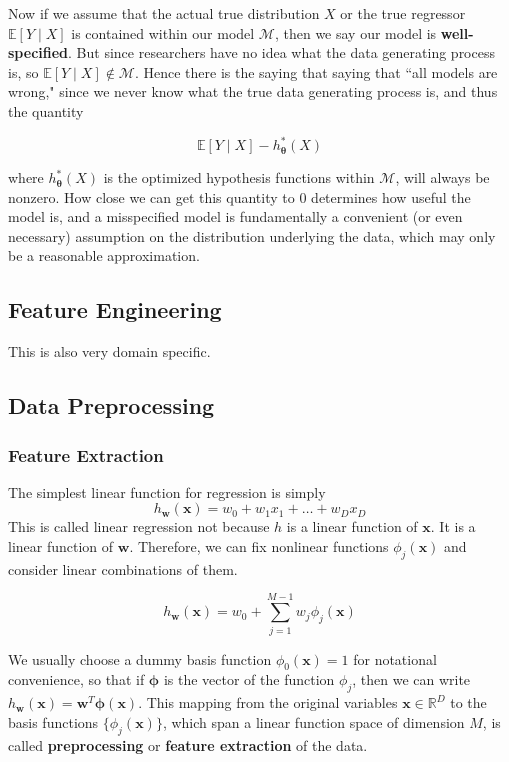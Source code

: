 \documentclass{article}
\begin{document}
    Now if we assume that the actual true distribution $X$ or the true regressor $\mathbb{E}[Y\mid X]$ is contained within our model $\mathcal{M}$, then we say our model is \textbf{well-specified}. But since researchers have no idea what the data generating process is, so $\mathbb{E}[Y\mid X] \not\in \mathcal{M}$. Hence there is the saying that saying that ``all models are wrong," since we never know what the true data generating process is, and thus the quantity 

      \[\mathbb{E}[Y \mid X] - h_{\boldsymbol{\theta}}^\ast (X)\]

    where $h_{\boldsymbol{\theta}}^\ast (X)$ is the optimized hypothesis functions within $\mathcal{M}$, will always be nonzero. How close we can get this quantity to $0$ determines how useful the model is, and a misspecified model is fundamentally a convenient (or even necessary) assumption on the distribution underlying the data, which may only be a reasonable approximation. 

  \subsection{Feature Engineering} 

    This is also very domain specific. 

  \subsection{Data Preprocessing}

    \subsubsection{Feature Extraction}

      The simplest linear function for regression is simply 
      \[h_\mathbf{w} (\mathbf{x}) = w_0 + w_1 x_1 + \ldots + w_D x_D\]
      This is called linear regression not because $h$ is a linear function of $\mathbf{x}$. It is a linear function of $\mathbf{w}$. Therefore, we can fix nonlinear functions $\phi_j (\mathbf{x})$ and consider linear combinations of them. 

        \[h_\mathbf{w} (\mathbf{x}) = w_0 + \sum_{j=1}^{M-1} w_j \phi_j (\mathbf{x})\]

      We usually choose a dummy basis function $\phi_0 (\mathbf{x}) = 1$ for notational convenience, so that if $\boldsymbol{\phi}$ is the vector of the function $\phi_j$, then we can write $h_\mathbf{w} (\mathbf{x}) = \mathbf{w}^T \boldsymbol{\phi} (\mathbf{x})$. This mapping from the original variables $\mathbf{x} \in \mathbb{R}^D$ to the basis functions $\{\phi_j (\mathbf{x})\}$, which span a linear function space of dimension $M$, is called \textbf{preprocessing} or \textbf{feature extraction} of the data. 
\end{document}
